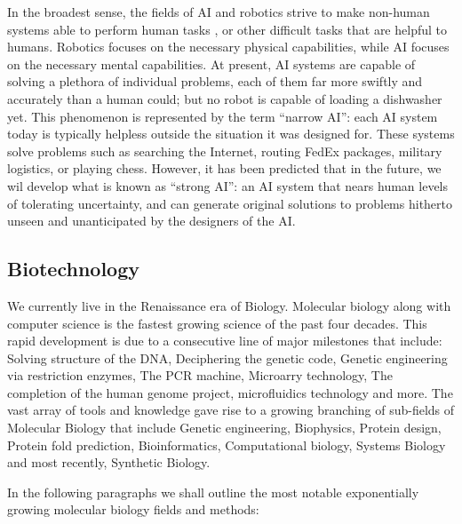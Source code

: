 \documentclass[letter,11pt]{article}
\begin{document}
In the broadest sense, the fields of AI and robotics strive to make non-human systems able to perform human tasks%
, or other difficult tasks that are helpful to humans. Robotics focuses on the necessary physical capabilities, while AI focuses on the necessary mental capabilities. At present, AI systems are capable of solving a plethora of individual problems, each of them far more swiftly and accurately than a human could; but no robot is capable of loading a dishwasher yet.
This phenomenon is represented by the term ``narrow AI'': each AI system today is typically helpless outside the situation it was designed for. These systems solve problems such as searching the Internet, routing FedEx packages, military logistics, or playing chess. However, it has been predicted that in the future, we wil develop what is known as ``strong AI'': an AI system that nears human levels of tolerating uncertainty, and can generate original solutions to problems hitherto unseen and unanticipated by the designers of the AI.

\subsection{Biotechnology}

We currently live in the Renaissance era of Biology. Molecular biology along
with computer science is the fastest growing science of the past four decades.
This rapid development is due to a consecutive line of major milestones that
include: Solving structure of the DNA, Deciphering the genetic code, Genetic
engineering via restriction enzymes, The PCR machine, Microarry technology, The
completion of the human genome project, microfluidics technology and more. The
vast array of tools and knowledge gave rise to a growing branching of
sub-fields of Molecular Biology that include Genetic engineering, Biophysics,
Protein design, Protein fold prediction, Bioinformatics, Computational biology,
Systems Biology and most recently, Synthetic Biology.
 
In the following paragraphs we shall outline the most notable exponentially
growing molecular biology fields and methods:
 
\end{document}
